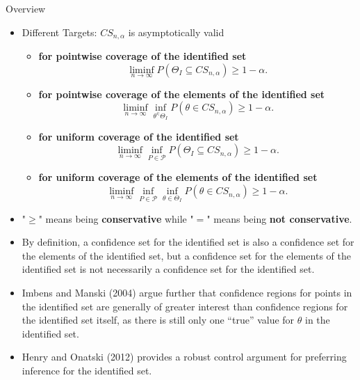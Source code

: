 \documentclass[aspectratio=169]{beamer}  %
\begin{document}
\begin{frame}{Overview}
    \begin{itemize}
        \item Different Targets:
        $CS_{n,\alpha}$ is asymptotically valid
        \begin{itemize}
            \item \textbf{for pointwise coverage of the identified set} $$\liminf_{n\to\infty}P(\Theta_I\subseteq CS_{n,\alpha})\geq1-\alpha. $$
            \item  \textbf{for pointwise coverage of the elements of the identified set} $$\liminf_{n\to\infty}\inf_{\theta^\in\Theta_I}P(\theta\in CS_{n,\alpha})\geq1-\alpha. $$
            \item \textbf{for uniform coverage of the identified set} $$\liminf_{n\to\infty}\inf_{P\in\mathscr{P}}P(\Theta_I\subseteq CS_{n,\alpha})\geq1-\alpha. $$
            \item \textbf{for uniform coverage of the elements of the identified set} $$\liminf_{n\to\infty}\inf_{P\in\mathscr{P}}\inf_{\theta\in\Theta_I}P(\theta\in CS_{n,\alpha})\geq1-\alpha. $$
          \end{itemize}
          \item "$\geq$" means being \textbf{conservative} while "$=$" means being \textbf{not conservative}.
    \end{itemize}
\end{frame}

\begin{frame}
    \begin{itemize}
        \item By definition, a confidence set for the identified set is also a confidence set for the elements of the identified set, but a confidence set for the elements of the identified set is not necessarily a confidence set for the identified set.
        \item Imbens and Manski (2004) argue further that confidence regions for  points in the identified set are generally of greater interest than confidence regions for the identified  set itself, as there is still only one “true” value for $\theta$ in the identified set.
        \item Henry and Onatski (2012) provides a robust control argument for preferring inference for the identified set.
    \end{itemize}
\end{frame}

\end{document}
